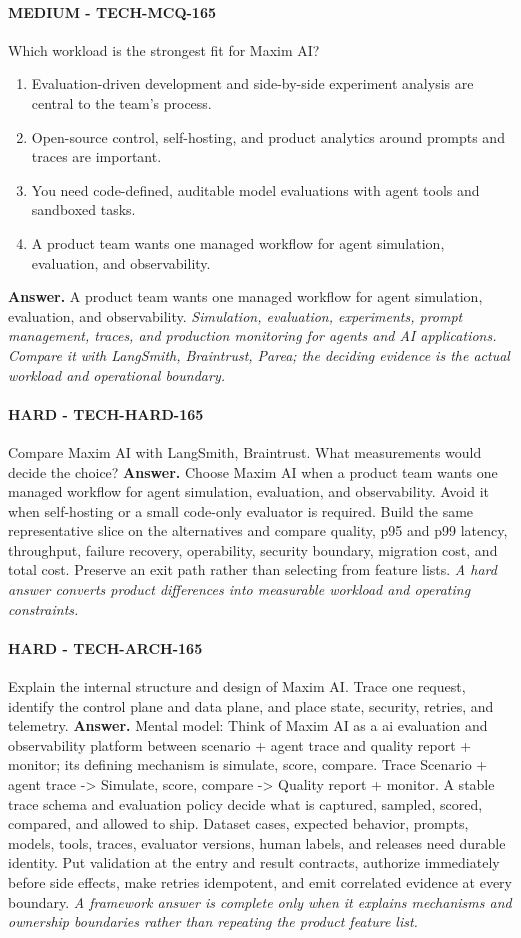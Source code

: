 \paragraph{MEDIUM - TECH-MCQ-165} Which workload is the strongest fit for Maxim AI?
\begin{enumerate}[label=\Alph*.]
\item Evaluation-driven development and side-by-side experiment analysis are central to the team's process.
\item Open-source control, self-hosting, and product analytics around prompts and traces are important.
\item You need code-defined, auditable model evaluations with agent tools and sandboxed tasks.
\item A product team wants one managed workflow for agent simulation, evaluation, and observability.
\end{enumerate}
\textbf{Answer.} A product team wants one managed workflow for agent simulation, evaluation, and observability.
\textit{Simulation, evaluation, experiments, prompt management, traces, and production monitoring for agents and AI applications. Compare it with LangSmith, Braintrust, Parea; the deciding evidence is the actual workload and operational boundary.}
\paragraph{HARD - TECH-HARD-165} Compare Maxim AI with LangSmith, Braintrust. What measurements would decide the choice?
\textbf{Answer.} Choose Maxim AI when a product team wants one managed workflow for agent simulation, evaluation, and observability. Avoid it when self-hosting or a small code-only evaluator is required. Build the same representative slice on the alternatives and compare quality, p95 and p99 latency, throughput, failure recovery, operability, security boundary, migration cost, and total cost. Preserve an exit path rather than selecting from feature lists.
\textit{A hard answer converts product differences into measurable workload and operating constraints.}
\paragraph{HARD - TECH-ARCH-165} Explain the internal structure and design of Maxim AI. Trace one request, identify the control plane and data plane, and place state, security, retries, and telemetry.
\textbf{Answer.} Mental model: Think of Maxim AI as a ai evaluation and observability platform between scenario + agent trace and quality report + monitor; its defining mechanism is simulate, score, compare. Trace Scenario + agent trace -> Simulate, score, compare -> Quality report + monitor. A stable trace schema and evaluation policy decide what is captured, sampled, scored, compared, and allowed to ship. Dataset cases, expected behavior, prompts, models, tools, traces, evaluator versions, human labels, and releases need durable identity. Put validation at the entry and result contracts, authorize immediately before side effects, make retries idempotent, and emit correlated evidence at every boundary.
\textit{A framework answer is complete only when it explains mechanisms and ownership boundaries rather than repeating the product feature list.}
